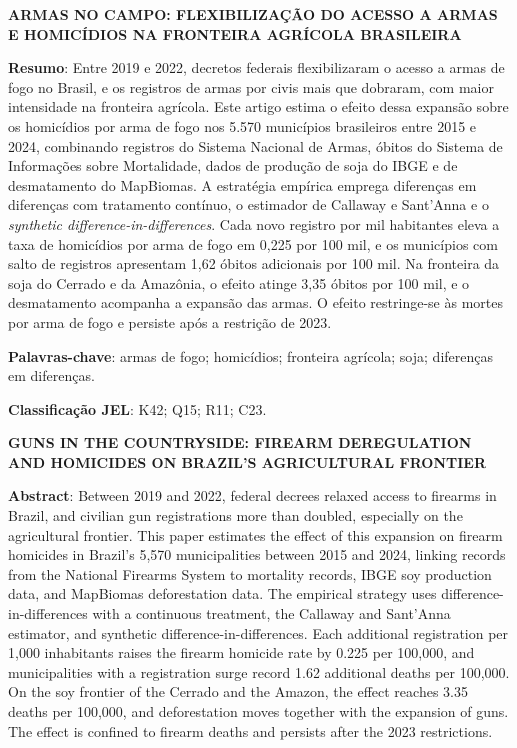 \documentclass[12pt,a4paper]{article}
\begin{document}
\begin{center}
\textbf{ARMAS NO CAMPO: FLEXIBILIZAÇÃO DO ACESSO A ARMAS E HOMICÍDIOS NA FRONTEIRA AGRÍCOLA BRASILEIRA}
\end{center}

\noindent\textbf{Resumo}: Entre 2019 e 2022, decretos federais flexibilizaram o acesso a armas de fogo no Brasil, e os registros de armas por civis mais que dobraram, com maior intensidade na fronteira agrícola. Este artigo estima o efeito dessa expansão sobre os homicídios por arma de fogo nos 5.570 municípios brasileiros entre 2015 e 2024, combinando registros do Sistema Nacional de Armas, óbitos do Sistema de Informações sobre Mortalidade, dados de produção de soja do IBGE e de desmatamento do MapBiomas. A estratégia empírica emprega diferenças em diferenças com tratamento contínuo, o estimador de Callaway e Sant'Anna e o \textit{synthetic difference-in-differences}. Cada novo registro por mil habitantes eleva a taxa de homicídios por arma de fogo em 0{,}225 por 100 mil, e os municípios com salto de registros apresentam 1{,}62 óbitos adicionais por 100 mil. Na fronteira da soja do Cerrado e da Amazônia, o efeito atinge 3{,}35 óbitos por 100 mil, e o desmatamento acompanha a expansão das armas. O efeito restringe-se às mortes por arma de fogo e persiste após a restrição de 2023.

\noindent\textbf{Palavras-chave}: armas de fogo; homicídios; fronteira agrícola; soja; diferenças em diferenças.

\noindent\textbf{Classificação JEL}: K42; Q15; R11; C23.

\noindent\textbf{GUNS IN THE COUNTRYSIDE: FIREARM DEREGULATION AND HOMICIDES ON BRAZIL'S AGRICULTURAL FRONTIER}

\noindent\textbf{Abstract}: Between 2019 and 2022, federal decrees relaxed access to firearms in Brazil, and civilian gun registrations more than doubled, especially on the agricultural frontier. This paper estimates the effect of this expansion on firearm homicides in Brazil's 5,570 municipalities between 2015 and 2024, linking records from the National Firearms System to mortality records, IBGE soy production data, and MapBiomas deforestation data. The empirical strategy uses difference-in-differences with a continuous treatment, the Callaway and Sant'Anna estimator, and synthetic difference-in-differences. Each additional registration per 1,000 inhabitants raises the firearm homicide rate by 0.225 per 100,000, and municipalities with a registration surge record 1.62 additional deaths per 100,000. On the soy frontier of the Cerrado and the Amazon, the effect reaches 3.35 deaths per 100,000, and deforestation moves together with the expansion of guns. The effect is confined to firearm deaths and persists after the 2023 restrictions.
\end{document}
